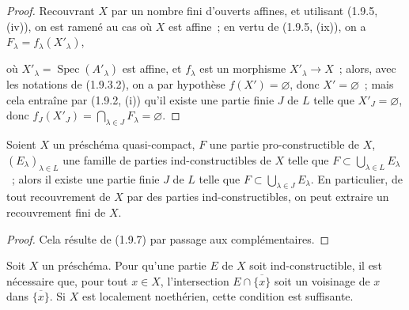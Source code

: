 \begin{proof}
Recouvrant $X$ par un nombre fini d'ouverts affines, et utilisant (1.9.5,
(iv)), on est ramené au cas où $X$ est affine~; en vertu de (1.9.5, (ix)), on
a $F_\lambda=f_\lambda(X'_\lambda)$,


où $X'_\lambda=\operatorname{Spec}(A'_\lambda)$ est affine, et $f_\lambda$
est un morphisme $X'_\lambda\to X$~; alors, avec les notations de (1.9.3.2),
on a par hypothèse $f(X')=\varnothing$, donc $X'=\varnothing$~; mais cela
entraîne par (1.9.2, (i)) qu'il existe une partie finie $J$ de $L$ telle que
$X'_J=\varnothing$, donc
$f_J(X'_J)=\bigcap_{\lambda\in J}F_\lambda=\varnothing$.
\end{proof}

\begin{corollary}[1.9.9]
\label{IV.1.9.9-fr}
Soient $X$ un préschéma quasi-compact, $F$ une partie pro-constructible de
$X$, $(E_\lambda)_{\lambda\in L}$ une famille de parties ind-constructibles
de $X$ telle que $F\subset\bigcup_{\lambda\in L}E_\lambda$~; alors il existe
une partie finie $J$ de $L$ telle que
$F\subset\bigcup_{\lambda\in J}E_\lambda$. En particulier, de tout
recouvrement de $X$ par des parties ind-constructibles, on peut extraire un
recouvrement fini de $X$.
\end{corollary}

\begin{proof}
Cela résulte de (1.9.7) par passage aux complémentaires.
\end{proof}

\begin{proposition}[1.9.10]
\label{IV.1.9.10-fr}
Soit $X$ un préschéma. Pour qu'une partie $E$ de $X$ soit
ind-constructible, il est nécessaire que, pour tout $x\in X$, l'intersection
$E\cap\overline{\{x\}}$ soit un voisinage de $x$ dans
$\overline{\{x\}}$. Si $X$ est localement noethérien, cette condition est
suffisante.
\end{proposition}

